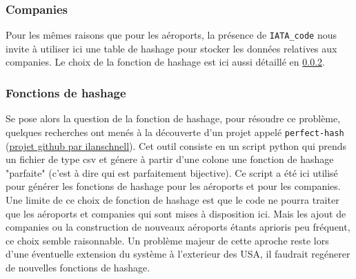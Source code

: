 \documentclass[a4paper, 9pt]{article}
\begin{document}
	\subsubsection{Companies}
	Pour les mêmes raisons que pour les aéroports, la présence de \lstinline|IATA_code| nous invite à utiliser ici une table de hashage pour stocker les données relatives aux companies.
	Le choix de la fonction de hashage est ici aussi détaillé en \ref{2.1.3}.\\
	
	\subsubsection{Fonctions de hashage} \label{2.1.3}
	Se pose alors la question de la fonction de hashage, pour résoudre ce problème, quelques recherches ont menés à la découverte d'un projet appelé \lstinline|perfect-hash| (\href{https://github.com/ilanschnell/perfect-hash}{projet github par ilanschnell}). Cet outil consiste en un script python qui prends un fichier de type csv et génere à partir d'une colone une fonction de hashage "parfaite" (c'est à dire qui est parfaitement bijective). Ce script a été ici utilisé pour générer les fonctions de hashage pour les aéroports et pour les companies.\\
	
	Une limite de ce choix de fonction de hashage est que le code ne pourra traiter que les aéroports et companies qui sont mises à disposition ici. Mais les ajout de companies ou la construction de nouveaux aéroports étants aprioris peu fréquent, ce choix semble raisonnable. Un problème majeur de cette aproche reste lors d'une éventuelle extension du système à l'exterieur des USA, il faudrait regénerer de nouvelles fonctions de hashage.
	
\end{document}
